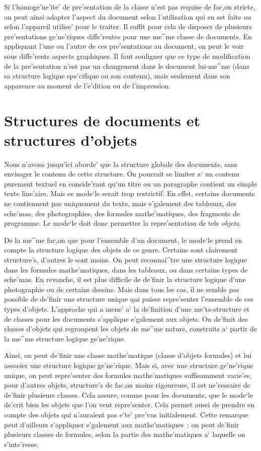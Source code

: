 Si l'homoge'ne'ite' de pre'sentation de la classe n'est pas requise de
fac,on stricte, on peut ainsi adapter l'aspect du document selon
l'utilisation qui en est faite ou selon l'appareil utilise' pour le
traiter. Il suffit pour cela de disposer de plusieurs pre'sentations
ge'ne'riques diffe'rentes pour une me^me classe de documents.
\label{presmul}
En appliquant l'une ou l'autre de ces pre'sentations au document, on peut le
voir sous diffe'rents aspects graphiques. Il faut souligner que ce type de
modification de la pre'sentation n'est pas un changement dans le document
lui-me^me (dans sa structure logique spe'cifique ou son contenu), mais
seulement dans son apparence au moment de l'e'dition ou de l'impression.

\section{Structures de documents et structures d'objets}

Nous n'avons jusqu'ici aborde' que la structure globale des documents,
sans envisager le contenu de cette structure. On pourrait se limiter a`
un contenu purement textuel en conside'rant qu'un titre ou un paragraphe
contient un simple texte line'aire. Mais ce mode`le serait trop restrictif.
En effet, certains documents ne contiennent pas uniquement du texte,
mais e'galement des tableaux, des sche'mas, des photographies, des
formules mathe'matiques, des fragments de programme. Le mode`le doit donc
permettre la repre'sentation de tels {\em objets}.

De la me^me fac,on que pour l'ensemble d'un document, le mode`le prend en
compte la structure logique des objets de ce genre. Certains sont clairement
structure's, d'autres le sont moins. On peut reconnai^tre une structure
logique dans les formules mathe'matiques, dans les tableaux,
ou dans certains types de sche'mas. En revanche, il est plus difficile de
de'finir la structure logique d'une photographie ou de certains dessins.
Mais dans tous les cas, il ne semble pas possible de de'finir une structure
unique qui puisse repre'senter l'ensemble de ces types d'objets. L'approche
qui a mene' a` la de'finition d'une me'ta-structure et de classes pour les
documents s'applique e'galement aux objets. On de'finit des classes d'objets
qui regroupent les objets de me^me nature, construits a` partir de la me^me
structure logique ge'ne'rique.

Ainsi, on peut de'finir une classe mathe'matique (classe d'objets formules)
et lui associer une structure logique ge'ne'rique. Mais si, avec une structure
ge'ne'rique unique, on peut repre'senter des formules mathe'matiques suffisamment
varie'es, pour d'autres objets, structure's de fac,on moins rigoureuse, il
est ne'cessaire de de'finir plusieurs classes. Cela assure, comme pour les
documents, que le mode`le de'crit bien les objets que l'on veut repre'senter.
Cela permet aussi de prendre en compte des objets qui n'auraient pas e'te'
pre'vus initialement. Cette remarque peut d'ailleurs s'appliquer e'galement
aux mathe'matiques~: on peut de'finir plusieurs classes de formules, selon la
partie des mathe'matiques a` laquelle on s'inte'resse.

